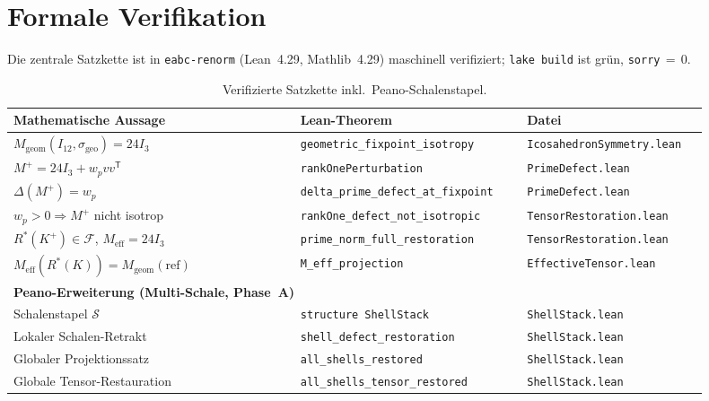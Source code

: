 \documentclass[11pt,a4paper]{article}
\begin{document}
\section{Formale Verifikation}
\label{sec:formal-verification}

Die zentrale Satzkette ist in \texttt{eabc-renorm} (Lean~4.29, Mathlib~4.29)
maschinell verifiziert; \texttt{lake build} ist grün, \texttt{sorry}\,$=\,0$.

\begin{table}[h!]
\centering
\small
\begin{tabular}{p{0.38\linewidth}p{0.30\linewidth}p{0.24\linewidth}}
\hline
\textbf{Mathematische Aussage} & \textbf{Lean-Theorem} & \textbf{Datei} \\
\hline
$M_{\mathrm{geom}}(I_{12},\sigma_{\mathrm{geo}})=24I_3$
  & \texttt{geometric\_fixpoint\_isotropy} & \texttt{IcosahedronSymmetry.lean} \\
$M^+=24I_3+w_pvv^{\mathsf T}$
  & \texttt{rankOnePerturbation} & \texttt{PrimeDefect.lean} \\
$\Delta(M^+)=w_p$
  & \texttt{delta\_prime\_defect\_at\_fixpoint} & \texttt{PrimeDefect.lean} \\
$w_p>0\Rightarrow M^+$ nicht isotrop
  & \texttt{rankOne\_defect\_not\_isotropic} & \texttt{TensorRestoration.lean} \\
$R^*(K^+)\in\mathcal{F}$, $M_{\mathrm{eff}}=24I_3$
  & \texttt{prime\_norm\_full\_restoration} & \texttt{TensorRestoration.lean} \\
$M_{\mathrm{eff}}(R^*(K))=M_{\mathrm{geom}}(\mathrm{ref})$
  & \texttt{M\_eff\_projection} & \texttt{EffectiveTensor.lean} \\
\hline
\multicolumn{3}{l}{\textbf{Peano-Erweiterung (Multi-Schale, Phase~A)}} \\
\hline
Schalenstapel $\mathcal{S}$
  & \texttt{structure ShellStack} & \texttt{ShellStack.lean} \\
Lokaler Schalen-Retrakt
  & \texttt{shell\_defect\_restoration} & \texttt{ShellStack.lean} \\
Globaler Projektionssatz
  & \texttt{all\_shells\_restored} & \texttt{ShellStack.lean} \\
Globale Tensor-Restauration
  & \texttt{all\_shells\_tensor\_restored} & \texttt{ShellStack.lean} \\
\hline
\end{tabular}
\caption{Verifizierte Satzkette inkl.\ Peano-Schalenstapel.}
\label{tab:lean-theorems}
\end{table}
\end{document}
